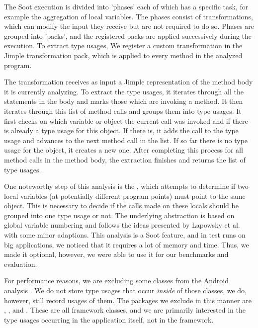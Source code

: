 The Soot execution is divided into 'phases' each of which has a specific task, for example the aggregation of local variables.
The phases consist of transformations, which can modify the input they receive but are not required to do so.
Phases are grouped into 'packs', and the registered packs are applied successively during the execution.
To extract type usages, We register a custom transformation in the Jimple transformation pack, which is applied to every method in the analyzed program.

The transformation receives as input a Jimple representation of the method body it is currently analyzing.
To extract the type usages, it iterates through all the statements in the body and marks those which are invoking a method.
It then iterates through this list of method calls and groups them into type usages.
It first checks on which variable or object the current call was invoked and if there is already a type usage for this object.
If there is, it adds the call to the type usage and advances to the next method call in the list.
If so far there is no type usage for the object, it creates a new one.
After completing this process for all method calls in the method body, the extraction finishes and returns the list of type usages.

One noteworthy step of this analysis is the , which attempts to determine if two local variables (at potentially different program points) must point to the same object.
This is necessary to decide if the calls made on these locals should be grouped into one type usage or not.
The underlying abstraction is based on global variable numbering and follows the ideas presented by Lapowsky et al. \cite{lapkowski1998extended} with some minor adaptions.
This analysis is a Soot feature, and in test runs on big applications, we noticed that it requires a lot of memory and time.
Thus, we made it optional, however, we were able to use it for our benchmarks and evaluation.

For performance reasons, we are excluding some classes from the Android analysis .
We do not store type usages that occur \emph{inside} of those classes, we do, however, still record usages of them.
The packages we exclude in this manner are , ,  and  .
These are all framework classes, and we are primarily interested in the type usages occurring in the application itself, not in the framework.

